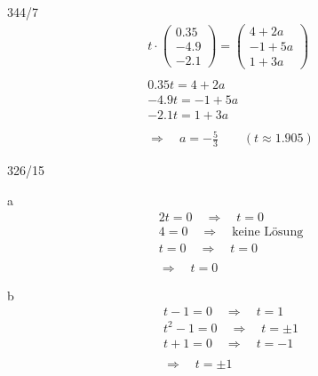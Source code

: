 \begin{exercise}{344/7}
  \begin{gather*}
    t \cdot \begin{pmatrix}0.35 \\ -4.9 \\ -2.1\end{pmatrix} = \begin{pmatrix}4 + 2a \\ -1 + 5a \\ 1 + 3a\end{pmatrix} \\\\
    0.35t = 4 + 2a \\
    -4.9t = -1 + 5a \\
    -2.1t = 1 + 3a \\\\
    \Rightarrow\quad a = -\frac{5}{3} \qquad (t \approx 1.905)
  \end{gather*}
\end{exercise}
\begin{exercise}{326/15}
  \item [a]
  \begin{gather*}
    2t = 0 \quad\Rightarrow\quad t = 0 \\
    4 = 0 \quad\Rightarrow\quad \text{keine Lösung} \\
    t = 0 \quad\Rightarrow\quad t = 0 \\\\
    \Rightarrow\quad t = 0
  \end{gather*}
  \item [b]
  \begin{gather*}
    t - 1 = 0 \quad\Rightarrow\quad t = 1 \\
    t^2 - 1 = 0 \quad\Rightarrow\quad t = \pm1 \\
    t + 1 = 0 \quad\Rightarrow\quad t = -1 \\\\
    \Rightarrow\quad t = \pm1
  \end{gather*}
\end{exercise}
\newpage
